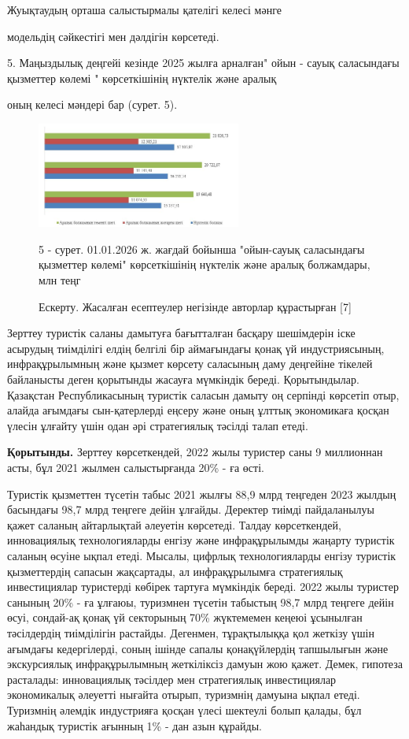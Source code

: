 Жуықтаудың орташа салыстырмалы қателігі келесі мәнге


модельдің сәйкестігі мен дәлдігін көрсетеді.

5. Маңыздылық деңгейі кезінде 2025 жылға арналған" ойын - сауық
саласындағы қызметтер көлемі " көрсеткішінің нүктелік және аралық


оның келесі мәндері бар (сурет. 5).




\begin{figure}[H]
	\centering
	\includegraphics[width=0.6\textwidth]{media/ekon/image6.6}
	\caption*{5 - сурет. 01.01.2026 ж. жағдай бойынша "ойын-сауық саласындағы
  қызметтер көлемі" көрсеткішінің нүктелік және аралық болжамдары, млн
  теңг}
  \caption*{Ескерту. Жасалған есептеулер негізінде авторлар құрастырған {[}7{]}}
\end{figure}

Зерттеу туристік саланы дамытуға бағытталған басқару шешімдерін іске
асырудың тиімділігі елдің белгілі бір аймағындағы қонақ үй
индустриясының, инфрақұрылымның және қызмет көрсету саласының даму
деңгейіне тікелей байланысты деген қорытынды жасауға мүмкіндік береді.
Қорытындылар. Қазақстан Республикасының туристік саласын дамыту оң
серпінді көрсетіп отыр, алайда ағымдағы сын-қатерлерді еңсеру және оның
ұлттық экономикаға қосқан үлесін ұлғайту үшін одан әрі стратегиялық
тәсілді талап етеді.

{\bfseries Қорытынды.} Зерттеу көрсеткендей, 2022 жылы туристер саны 9
миллионнан асты, бұл 2021 жылмен салыстырғанда 20\% - ға өсті.

Туристік қызметтен түсетін табыс 2021 жылғы 88,9 млрд теңгеден 2023
жылдың басындағы 98,7 млрд теңгеге дейін ұлғайды. Деректер тиімді
пайдаланылуы қажет саланың айтарлықтай әлеуетін көрсетеді. Талдау
көрсеткендей, инновациялық технологияларды енгізу және инфрақұрылымды
жаңарту туристік саланың өсуіне ықпал етеді. Мысалы, цифрлық
технологияларды енгізу туристік қызметтердің сапасын жақсартады, ал
инфрақұрылымға стратегиялық инвестициялар туристерді көбірек тартуға
мүмкіндік береді. 2022 жылы туристер санының 20\% - ға ұлғаюы, туризмнен
түсетін табыстың 98,7 млрд теңгеге дейін өсуі, сондай-ақ қонақ үй
секторының 70\% жүктемемен кеңеюі ұсынылған тәсілдердің тиімділігін
растайды. Дегенмен, тұрақтылыққа қол жеткізу үшін ағымдағы кедергілерді,
соның ішінде сапалы қонақүйлердің тапшылығын және экскурсиялық
инфрақұрылымның жеткіліксіз дамуын жою қажет. Демек, гипотеза расталады:
инновациялық тәсілдер мен стратегиялық инвестициялар экономикалық
әлеуетті нығайта отырып, туризмнің дамуына ықпал етеді. Туризмнің
әлемдік индустрияға қосқан үлесі шектеулі болып қалады, бұл жаһандық
туристік ағынның 1\% - дан азын құрайды.

